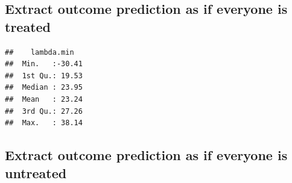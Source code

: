 \documentclass[
]{book}
\newenvironment{Shaded}{\begin{snugshade}}{\end{snugshade}}
\newcommand{\AttributeTok}[1]{\textcolor[rgb]{0.77,0.63,0.00}{#1}}
\newcommand{\DecValTok}[1]{\textcolor[rgb]{0.00,0.00,0.81}{#1}}
\newcommand{\FunctionTok}[1]{\textcolor[rgb]{0.00,0.00,0.00}{#1}}
\newcommand{\NormalTok}[1]{#1}
\newcommand{\OtherTok}[1]{\textcolor[rgb]{0.56,0.35,0.01}{#1}}
\newcommand{\SpecialCharTok}[1]{\textcolor[rgb]{0.00,0.00,0.00}{#1}}
\newcommand{\StringTok}[1]{\textcolor[rgb]{0.31,0.60,0.02}{#1}}
\begin{document}
\hypertarget{extract-outcome-prediction-as-if-everyone-is-treated-1}{%
\subsection{Extract outcome prediction as if everyone is treated}\label{extract-outcome-prediction-as-if-everyone-is-treated-1}}

\begin{Shaded}
\end{Shaded}

\begin{verbatim}
##    lambda.min    
##  Min.   :-30.41  
##  1st Qu.: 19.53  
##  Median : 23.95  
##  Mean   : 23.24  
##  3rd Qu.: 27.26  
##  Max.   : 38.14
\end{verbatim}

\hypertarget{extract-outcome-prediction-as-if-everyone-is-untreated-1}{%
\subsection{Extract outcome prediction as if everyone is untreated}\label{extract-outcome-prediction-as-if-everyone-is-untreated-1}}

\begin{Shaded}
\end{Shaded}
\end{document}
